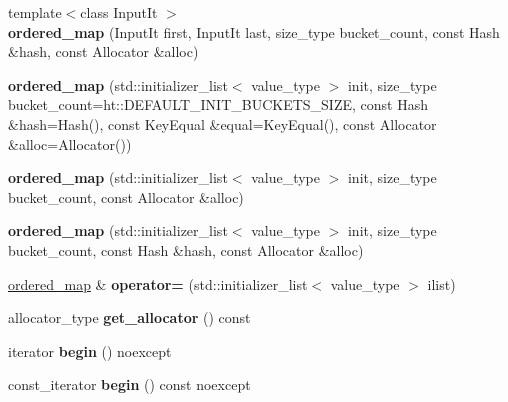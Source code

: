 \begin{DoxyCompactItemize}
{\footnotesize template$<$class Input\+It $>$ }\\{\bfseries ordered\+\_\+map} (Input\+It first, Input\+It last, size\+\_\+type bucket\+\_\+count, const Hash \&hash, const Allocator \&alloc)
\item 
\mbox{\label{classtsl_1_1ordered__map_a3b62cd4ee69c7fbe3f5bf875f49cec9b}} 
{\bfseries ordered\+\_\+map} (std\+::initializer\+\_\+list$<$ value\+\_\+type $>$ init, size\+\_\+type bucket\+\_\+count=ht\+::\+D\+E\+F\+A\+U\+L\+T\+\_\+\+I\+N\+I\+T\+\_\+\+B\+U\+C\+K\+E\+T\+S\+\_\+\+S\+I\+ZE, const Hash \&hash=Hash(), const Key\+Equal \&equal=Key\+Equal(), const Allocator \&alloc=Allocator())
\item 
\mbox{\label{classtsl_1_1ordered__map_ac54d2eb64f77000f6d6e98f44b69f76b}} 
{\bfseries ordered\+\_\+map} (std\+::initializer\+\_\+list$<$ value\+\_\+type $>$ init, size\+\_\+type bucket\+\_\+count, const Allocator \&alloc)
\item 
\mbox{\label{classtsl_1_1ordered__map_a76800b448b7e9a0d15adb897186460fb}} 
{\bfseries ordered\+\_\+map} (std\+::initializer\+\_\+list$<$ value\+\_\+type $>$ init, size\+\_\+type bucket\+\_\+count, const Hash \&hash, const Allocator \&alloc)
\item 
\mbox{\label{classtsl_1_1ordered__map_a3ccb595b5ddb9b138d71960a0219f9cd}} 
\mbox{\hyperlink{classtsl_1_1ordered__map}{ordered\+\_\+map}} \& {\bfseries operator=} (std\+::initializer\+\_\+list$<$ value\+\_\+type $>$ ilist)
\item 
\mbox{\label{classtsl_1_1ordered__map_af41bedbb69e9d311f851a84617ef68d1}} 
allocator\+\_\+type {\bfseries get\+\_\+allocator} () const
\item 
\mbox{\label{classtsl_1_1ordered__map_adf30999e92ec34f19826ad229e651928}} 
iterator {\bfseries begin} () noexcept
\item 
\mbox{\label{classtsl_1_1ordered__map_a49bc2b1dbdd38a9edf539a3d5312e3b3}} 
const\+\_\+iterator {\bfseries begin} () const noexcept
\item 
\mbox{\label{classtsl_1_1ordered__map_af14b3649e0ba95aa514a4e571d0b5ca6}} 

\end{DoxyCompactItemize}
